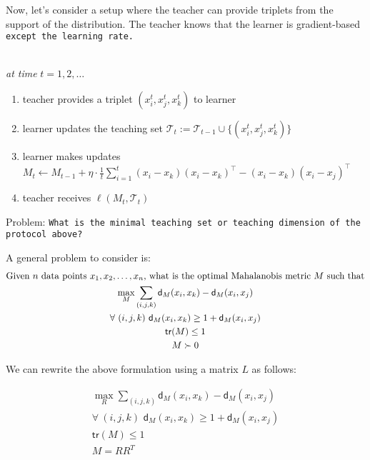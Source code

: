 Now, let's consider a setup where the teacher can provide triplets from the support of the distribution. The teacher knows that the learner is gradient-based \tt{except} the learning rate. 
\begin{shaded}
\noindent \\
\noindent\textit{at time} $t = 1,2,\ldots$
\begin{enumerate}
    \item teacher provides a triplet $(x_i^t,x_j^t,x_k^t)$ to learner
    \item learner updates the teaching set $\mathcal{T}_t := \mathcal{T}_{t-1} \cup \{(x_i^t,x_j^t,x_k^t)\}$
    \item  learner makes updates $M_t \leftarrow M_{t-1} + \eta\cdot \frac{1}{t} \sum_{i=1}^t (x_i - x_k)(x_i - x_k)^{\top} - (x_i - x_k)(x_i - x_j)^{\top}$
    \item teacher receives $\ell(M_t, \mathcal{T}_t)$
    
\end{enumerate}
\end{shaded}


Problem: \tt{What is the minimal teaching set or teaching dimension of the protocol above?}

A general problem to consider is:
\begin{gather}
    \textnormal{Given $n$ data points $x_1,x_2,\ldots,x_n$, what is the optimal Mahalanobis metric $M$ such that}\\
    \max_M \sum_{(i,j,k)} \mathsf{d}_M(x_i,x_k) - \mathsf{d}_M(x_i,x_j)\\
    \forall\ (i,j,k)\,\, \mathsf{d}_M(x_i,x_k) \ge 1 + \mathsf{d}_M(x_i,x_j)\\
    \mathsf{tr}(M) \le 1\\
    M \succ 0
\end{gather}
 
We can rewrite the above formulation using a matrix $L$ as follows:

\begin{gather}
    \max_{R} \sum_{(i,j,k)} \mathsf{d}_M(x_i,x_k) - \mathsf{d}_M(x_i,x_j)\\
    \forall\ (i,j,k)\,\, \mathsf{d}_M(x_i,x_k) \ge 1 + \mathsf{d}_M(x_i,x_j)\\
    \mathsf{tr}(M) \le 1\\
    M = RR^T
\end{gather}

